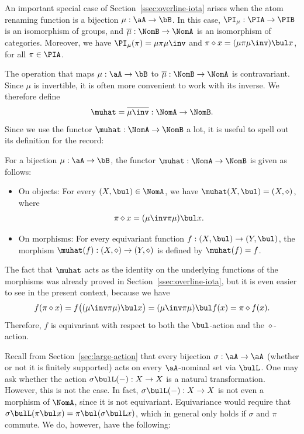 \documentclass[twoside,11pt]{entics}
\begin{document}
An important special case of Section~\ref{ssec:overline-iota} arises when
the atom renaming function is a bijection $\mu:\aA\to\bB$. In this
case, $\PI_{\mu}:\PIA\to\PIB$ is an isomorphism of
groups, and $\overline{\mu}:\NomB\to\NomA$ is an isomorphism of
categories. Moreover, we have $\PI_{\mu}(\pi) = \mu\pi
\mu\inv$ and $\pi\diamond x = (\mu\pi \mu\inv)\bul x$,
for all $\pi\in\PIA$.

The operation that maps $\mu:\aA\to\bB$ to
$\overline{\mu}:\NomB\to\NomA$ is contravariant. Since $\mu$ is
invertible, it is often more convenient to work with its inverse. We
therefore define
\[
\muhat = \overline{\mu\inv}:\NomA\to\NomB.
\]
Since we use the functor $\muhat:\NomA\to\NomB$ a lot, it is useful to
spell out its definition for the record:

\begin{xdefinition}\label{def:muhat}
  For a bijection $\mu:\aA\to\bB$, the functor $\muhat:\NomA\to\NomB$
  is given as follows:
  \begin{itemize}
  \item On objects: For every $(X,\bul)\in\NomA$, we have
    $\muhat(X,\bul)=(X,\diamond)$, where
    \[
    \pi\diamond x = (\mu\inv \pi \mu) \bul x.
    \]
    
  \item On morphisms: For every equivariant function $f:(X,\bul)\to
    (Y,\bul)$, the morphism $\muhat(f):(X,\diamond)\to (Y,\diamond)$
    is defined by $\muhat(f)=f$. 
  \end{itemize}
\end{xdefinition}

\begin{xremark}
  The fact that $\muhat$ acts as the identity on the underlying
  functions of the morphisms was already proved in
  Section~\ref{ssec:overline-iota}, but it is even easier to see in the
  present context, because we have
  \[
  f(\pi\diamond x) =f\big( (\mu\inv \pi \mu) \bul
  x\big) = (\mu\inv \pi \mu) \bul f(x)=\pi\diamond
  f(x).
  \]
  Therefore, $f$ is equivariant with respect to both the
  $\bul$-action and the $\diamond$-action.
\end{xremark}

Recall from Section~\ref{sec:large-action} that every bijection
$\sigma:\aA\to\aA$ (whether or not it is finitely supported) acts on
every $\aA$-nominal set via $\bulL$. One may ask whether the action
$\sigma\bulL(-):X\to X$ is a natural transformation. However, this is
not the case. In fact, $\sigma\bulL(-):X\to X$ is not even a morphism
of $\NomA$, since it is not equivariant. Equivariance would require
that $\sigma\bulL(\pi\bul x) = \pi\bul(\sigma\bulL x)$, which in
general only holds if $\sigma$ and $\pi$ commute. We do, however, have
the following:
\end{document}
